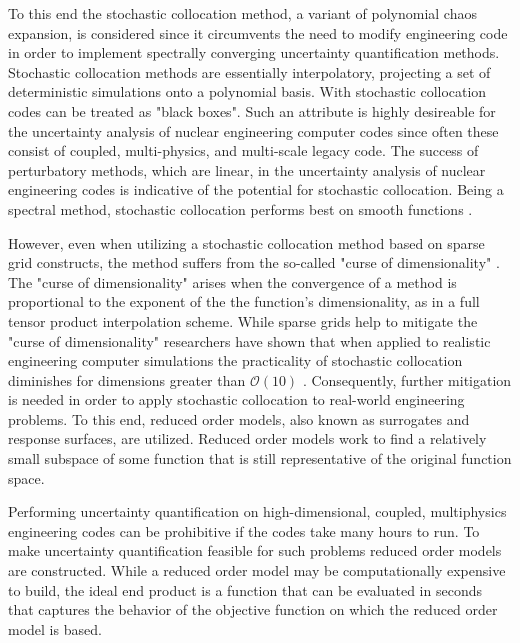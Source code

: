 To this end the stochastic collocation method, a variant of polynomial chaos expansion, is considered since it circumvents the need to modify engineering code in order to implement spectrally converging uncertainty quantification methods. Stochastic collocation methods are essentially interpolatory, projecting a set of deterministic simulations onto a polynomial basis. With stochastic collocation codes can be treated as "black boxes". Such an attribute is highly desireable for the uncertainty analysis of nuclear engineering computer codes since often these consist of coupled, multi-physics, and multi-scale legacy code. The success of perturbatory methods, which are linear, in the uncertainty analysis of nuclear engineering codes is indicative of the potential for stochastic collocation. Being a spectral method, stochastic collocation performs best on smooth functions \cite{BoydSpec}.    

However, even when utilizing a stochastic collocation method based on sparse grid constructs, the method suffers from the so-called "curse of dimensionality" \cite{LeMaitreKnio}. The "curse of dimensionality" arises when the convergence of a method is proportional to the exponent of the the function's dimensionality, as in a full tensor product interpolation scheme. While sparse grids help to mitigate the "curse of dimensionality" researchers have shown that when applied to realistic engineering computer simulations the practicality of stochastic collocation diminishes for dimensions greater than $\mathcal{O}(10)$ \cite{AHSGC_HighDimensions}. Consequently, further mitigation is needed in order to apply stochastic collocation to real-world engineering problems. To this end, reduced order models, also known as surrogates and response surfaces, are utilized. Reduced order models work to find a relatively small subspace of some function that is still representative of the original function space. 

Performing uncertainty quantification on high-dimensional, coupled, multiphysics engineering codes can be prohibitive if the codes take many hours to run. To make uncertainty quantification feasible for such problems reduced order models are constructed. While a reduced order model may be computationally expensive to build, the ideal end product is a function that can be evaluated in seconds that captures the behavior of the objective function on which the reduced order model is based.    



